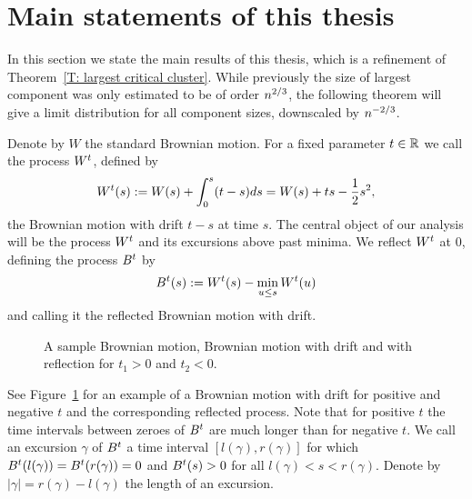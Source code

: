 \section{Main statements of this thesis}

In this section we state the main results of this thesis,
which is a refinement of Theorem~\ref{T: largest critical cluster}.
While previously the size of largest component was only estimated to be of order $n^{2 / 3}$,
the following theorem will give a limit distribution for all component sizes, downscaled by $n^{-2 / 3}$.

Denote by $W$ the standard Brownian motion. 
For a fixed parameter $t \in \mathbb{R}$ we call the process $W^t$, defined by
\begin{equation}
	W^t(s) := W(s) + \int_{0}^{s}(t-s)ds = W(s) + ts - \frac{1}{2}s^2,
\end{equation}
the Brownian motion with drift $t-s$ at time $s$.
The central object of our analysis will be the process $W^t$ and its excursions above past minima.
We reflect $W^t$ at $0$, defining the process $B^t$ by
\begin{equation}
	B^t(s) := W^t(s) - \min_{u \leq s}W^t(u)
\end{equation}
and calling it the reflected Brownian motion with drift.

\begin{figure}%
	\centering
	\subfloat[$W(s)$]{}%
	\quad
	\subfloat[$W^{t_1}(s)$]{}%
	\quad
	\subfloat[$B^{t_1}(s)$]{}%
	\quad
	\subfloat[$W^{t_2}(s)$]{}%
	\quad
	\subfloat[$B^{t_2}(s)$]{}%
	\caption{A sample Brownian motion, Brownian motion with drift and with reflection for $t_1>0$ and $t_2<0$.}%
	\label{F: BM}%
\end{figure}

See Figure~\ref{F: BM} for an example of a Brownian motion with drift for positive and negative $t$ and the corresponding reflected process.
Note that for positive $t$ the time intervals between zeroes of $B^t$ are much longer than for negative $t$.
We call an excursion $\gamma$ of $B^t$ a time interval $[l(\gamma), r(\gamma)]$ for which $B^t(l(\gamma)) = B^t(r(\gamma)) = 0$
and $B^t(s) > 0$ for all $l(\gamma) < s < r(\gamma)$.
Denote by $|\gamma| = r(\gamma) - l(\gamma)$ the length of an excursion.


